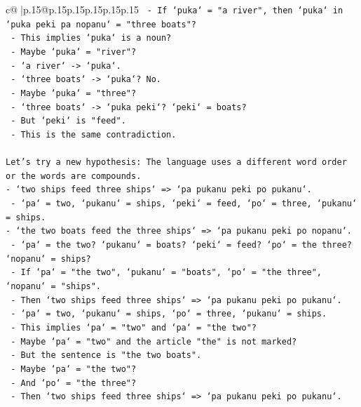 \documentclass{article}
\begin{document}
{\begin{supertabular}{c@{$\;$}|p{.15\linewidth}@{}p{.15\linewidth}p{.15\linewidth}p{.15\linewidth}p{.15\linewidth}p{.15\linewidth}}
{{{\texttt{               {-} If `puka` = "a river", then `puka` in `puka peki pa nopanu` = "three boats"?} \\
\texttt{               {-} This implies `puka` is a noun?} \\
\texttt{               {-} Maybe `puka` = "river"?} \\
\texttt{               {-} `a river` {-}> `puka`.} \\
\texttt{               {-} `three boats` {-}> `puka`? No.} \\
\texttt{               {-} Maybe `puka` = "three"?} \\
\texttt{               {-} `three boats` {-}> `puka peki`? `peki` = boats?} \\
\texttt{               {-} But `peki` is "feed".} \\
\texttt{               {-} This is the same contradiction.} \\
\\ 
\texttt{Let's try a new hypothesis: The language uses a different word order or the words are compounds.} \\
\texttt{{-} `two ships feed three ships` => `pa pukanu peki po pukanu`.} \\
\texttt{  {-} `pa` = two, `pukanu` = ships, `peki` = feed, `po` = three, `pukanu` = ships.} \\
\texttt{{-} `the two boats feed the three ships` => `pa pukanu peki po nopanu`.} \\
\texttt{  {-} `pa` = the two? `pukanu` = boats? `peki` = feed? `po` = the three? `nopanu` = ships?} \\
\texttt{  {-} If `pa` = "the two", `pukanu` = "boats", `po` = "the three", `nopanu` = "ships".} \\
\texttt{  {-} Then `two ships feed three ships` => `pa pukanu peki po pukanu`.} \\
\texttt{    {-} `pa` = two, `pukanu` = ships, `po` = three, `pukanu` = ships.} \\
\texttt{    {-} This implies `pa` = "two" and `pa` = "the two"?} \\
\texttt{    {-} Maybe `pa` = "two" and the article "the" is not marked?} \\
\texttt{    {-} But the sentence is "the two boats".} \\
\texttt{    {-} Maybe `pa` = "the two"?} \\
\texttt{    {-} And `po` = "the three"?} \\
\texttt{    {-} Then `two ships feed three ships` => `pa pukanu peki po pukanu`.} \\
}}}
\end{supertabular}}
\end{document}
